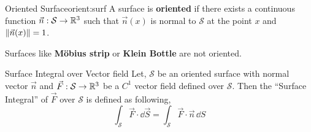 \documentclass[../Analysis-3.tex]{subfiles}
\begin{document}
\begin{Def}{Oriented Surface}{orient:surf}
  A surface is \textbf{oriented} if there exists a continuous function $\vec{n} : \mathcal{S} \to \mathbb{R}^3$ such that $\vec{n}(x)$ is normal to $\mathcal{S}$ at the point $x$ and $\norm{\vec{n}(x)} = 1$.
\end{Def}

Surfaces like \textbf{Möbius strip} or \textbf{Klein Bottle} are not oriented.

\begin{Def}{Surface Integral over Vector field}{}
  Let, $\mathcal{S}$ be an oriented surface with normal vector $\vec{n}$ and $\vec{F} : \mathcal{S} \to \mathbb{R}^3$ be a $C^1$ vector field defined over $\mathcal{S}$. Then the ``Surface Integral'' of $\vec{F}$ over $\mathcal{S}$ is defined as following,
  \[ \int_{\mathcal{S}} \vec{F} \cdot \dd \vec{S} = \int_{\mathcal{S}} \vec{F}\cdot\vec{n}\, \dd S \]
\end{Def}
\end{document}
